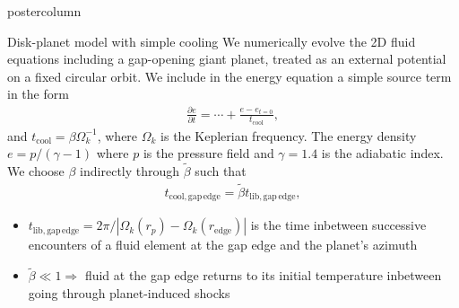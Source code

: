 \documentclass[final,hyperref={pdfpagelabels=false}]{beamer}
\begin{document}
\begin{frame}
\begin{columns}
\begin{column}{.49\textwidth}
\begin{beamercolorbox}[center,wd=\textwidth]{postercolumn}
\begin{minipage}[T]{.95\textwidth}
{            \begin{block}{{\Large Disk-planet model with simple
                  cooling}}
              \justifying
             We numerically evolve the 2D fluid equations including a
             gap-opening giant planet, treated as an external
             potential on a fixed circular orbit. We include in the
             energy equation  
        a simple source term in the form 
	\begin{align*}
	\frac{\partial e}{\partial t} = \cdots + \frac{e-e_{t=0}}{t_\mathrm{cool}},
	\end{align*}
        and $t_\mathrm{cool} = \beta \Omega_k^{-1}$, where $\Omega_k$
        is the Keplerian frequency. The energy density
        $e=p/(\gamma-1)$ where $p$ is the pressure field and
        $\gamma=1.4$ is the adiabatic index. We choose $\beta$ indirectly 
        through $\tilde{\beta}$ such that
        \begin{align*}
        t_\mathrm{cool, gap\,edge} = \tilde{\beta} t_\mathrm{lib, gap\,edge},
        \end{align*}
\vspace{-1.6cm}
        \begin{itemize}
        \item  $t_\mathrm{lib, gap\,edge}=2\pi/|\Omega_k(r_p)-\Omega_k(r_\mathrm{edge})|$ is the time inbetween
          successive encounters of a fluid element at the gap
          edge and the planet's azimuth
        \item $\tilde{\beta}\ll 1 \Rightarrow$ fluid at the gap edge
          returns to its initial temperature inbetween going through planet-induced shocks 
        \end{itemize}
        \end{block}
        \vfill

}
\end{minipage}
\end{beamercolorbox}
\end{column}
\end{columns}
\end{frame}
\end{document}
